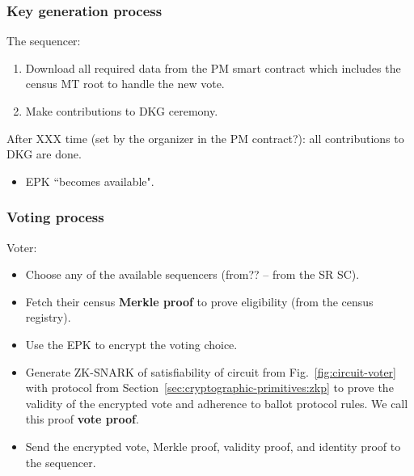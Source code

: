 \subsubsection{Key generation process} %
\label{sec:vocdoni-protocol:dkg}

The sequencer:
\begin{enumerate}
	\item Download all required data from the PM smart contract which includes the census MT root to handle the new vote.
	\item Make contributions to DKG ceremony.
\end{enumerate}

After XXX time (set by the organizer in the PM contract?): all contributions to DKG are done.

	
\begin{itemize}
	\item EPK ``becomes available".
\end{itemize}

\subsubsection{Voting process}
\label{sec:vocdoni-protocol:voting}

Voter:

\begin{itemize}
	\item Choose any of the available sequencers (from?? -- from the SR SC).
	\item Fetch their census \textbf{Merkle proof} to prove eligibility (from the census registry).
	\item Use the EPK to encrypt the voting choice.
	\item Generate ZK-SNARK of satisfiability of circuit from Fig.~\ref{fig:circuit-voter} with protocol from Section~\ref{sec:cryptographic-primitives:zkp} to prove the validity of the encrypted vote and adherence to ballot protocol rules. We call this proof \textbf{vote proof}.
	\item Send the encrypted vote, Merkle proof, validity proof, and identity proof to the sequencer.
\end{itemize}

